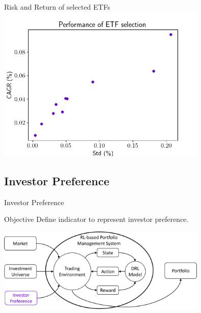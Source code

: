 \begin{frame}{Risk and Return of selected ETFs}
\centering
\includegraphics[width=10cm]{images/etfs.png}
\end{frame}

\subsection{Investor Preference}
\begin{frame}{Investor Preference}
    \begin{block}{Objective}
        Define indicator to represent investor preference.
    \end{block}
\centering
\includegraphics[width=10cm]{images/investor_preference.png}
\end{frame}

